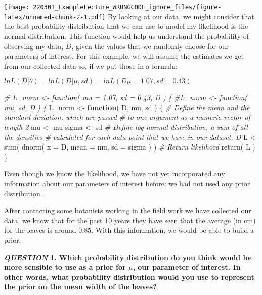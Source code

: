 \documentclass[
]{article}
\newenvironment{Shaded}{\begin{snugshade}}{\end{snugshade}}
\newcommand{\AttributeTok}[1]{\textcolor[rgb]{0.77,0.63,0.00}{#1}}
\newcommand{\CommentTok}[1]{\textcolor[rgb]{0.56,0.35,0.01}{\textit{#1}}}
\newcommand{\ControlFlowTok}[1]{\textcolor[rgb]{0.13,0.29,0.53}{\textbf{#1}}}
\newcommand{\FunctionTok}[1]{\textcolor[rgb]{0.00,0.00,0.00}{#1}}
\newcommand{\NormalTok}[1]{#1}
\newcommand{\OtherTok}[1]{\textcolor[rgb]{0.56,0.35,0.01}{#1}}
\begin{document}
\texttt{[image: 220301\_ExampleLecture\_WRONGCODE\_ignore\_files/figure-latex/unnamed-chunk-2-1.pdf]}
By looking at our data, we might consider that the best probability
distribution that we can use to model my likelihood is the normal
distribution. This function would help us understand the probability of
observing my data, \(D\), given the values that we randomly choose for
our parameters of interest. For this example, we will assume the
estimates we get from our collected data so, if we put those in a
formula:

\(lnL(D|\theta)=lnL(D|\mu,sd)=lnL(D\mu=1.07, sd=0.43)\)

\begin{Shaded}
\begin{Highlighting}[]
\CommentTok{\# L\_norm \textless{}{-} function( mu = 1.07, sd = 0.43, D ) \{}
\CommentTok{\#L\_norm \textless{}{-} function( mu, sd, D ) \{}
\NormalTok{L\_norm }\OtherTok{\textless{}{-}} \ControlFlowTok{function}\NormalTok{( D, mu, sd ) \{}
  \CommentTok{\# Define the mean and the standard deviation, which are passed }
  \CommentTok{\# to one argument as a numeric vector of length 2}
\NormalTok{  mu    }\OtherTok{\textless{}{-}}\NormalTok{ mu}
\NormalTok{  sigma }\OtherTok{\textless{}{-}}\NormalTok{ sd}
  \CommentTok{\# Define log{-}normal distribution, a sum of all the densities }
  \CommentTok{\# calculated for each data point that we have in our dataset, D}
\NormalTok{  L   }\OtherTok{\textless{}{-}} \FunctionTok{sum}\NormalTok{( }\FunctionTok{dnorm}\NormalTok{( }\AttributeTok{x =}\NormalTok{ D, }\AttributeTok{mean =}\NormalTok{ mu, }\AttributeTok{sd =}\NormalTok{ sigma ) )}
  \CommentTok{\# Return likelihood }
  \FunctionTok{return}\NormalTok{( L )}
\NormalTok{\}}
\end{Highlighting}
\end{Shaded}

Even though we know the likelihood, we have not yet incorporated any
information about our parameters of interest before: we had not used any
prior distribution.

After contacting some botanists working in the field work we have
collected our data, we know that for the past 10 years they have seen
that the average (in cm) for the leaves is around \(0.85\). With this
information, we would be able to build a prior.

\emph{\textbf{QUESTION}} \textbf{1. Which probability distribution do
you think would be more sensible to use as a prior for \(\mu\), our
parameter of interest. In other words, what probability distribution
would you use to represent the prior on the mean width of the leaves?}
\end{document}
